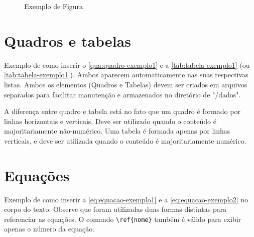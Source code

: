 \begin{figure}[!htb]
    \centering
    \caption{Exemplo de Figura}
    \begin{minipage}{\wd0}
        \label{fig:figura-exemplo-1}
    \end{minipage}
\end{figure}



\section{Quadros e tabelas}
\label{sec:tabelas}

Exemplo de como inserir o \autoref{qua:quadro-exemplo1} e a \autoref{tab:tabela-exemplo1} (ou \cref{tab:tabela-exemplo1}). Ambos aparecem automaticamente nas suas respectivas listas.
Ambos os elementos (Quadros e Tabelas) devem ser criados em arquivos separados para facilitar manutenção e armazenados no diretório de "/dados".



A diferença entre quadro e tabela está no fato que um quadro é formado por linhas horizontais e verticais. Deve ser utilizado quando o conteúdo é majoritariamente não-numérico. Uma tabela é formada apenas por linhas verticais, e deve ser utilizada quando o conteúdo é majoritariamente numérico.



\section{Equações}
\label{sec:equacoes}

Exemplo de como inserir a \autoref{eq:equacao-exemplo1} e a \cref{eq:equacao-exemplo2} no corpo do texto. Observe que foram utilizadas duas formas distintas para referenciar as equações. O comando \verb|\ref{nome}| também é válido para exibir apenas o número da equação.

